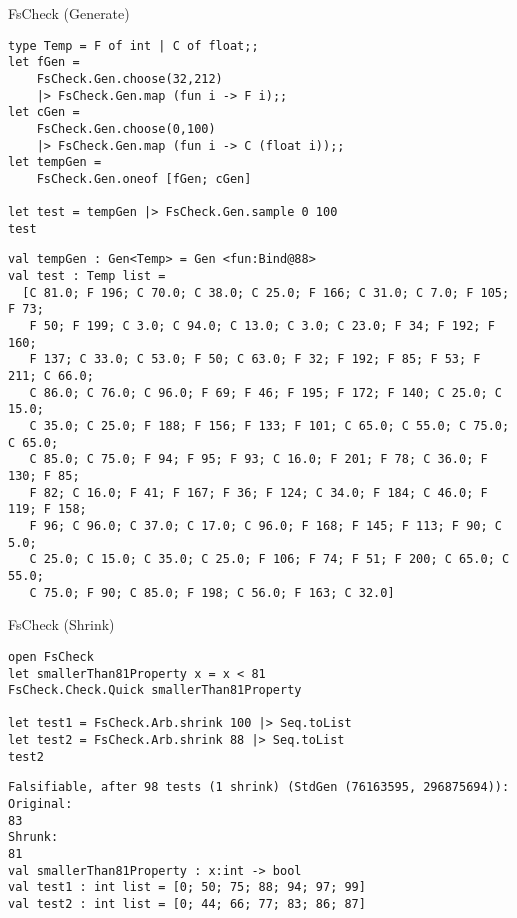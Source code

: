 \documentclass[t]{beamer}
\begin{document}
\begin{frame}[label={sec:org23fb002},fragile]{FsCheck (Generate)}
 \begin{verbatim}
type Temp = F of int | C of float;;
let fGen =
    FsCheck.Gen.choose(32,212)
    |> FsCheck.Gen.map (fun i -> F i);;
let cGen =
    FsCheck.Gen.choose(0,100)
    |> FsCheck.Gen.map (fun i -> C (float i));;
let tempGen =
    FsCheck.Gen.oneof [fGen; cGen]

let test = tempGen |> FsCheck.Gen.sample 0 100
test
\end{verbatim}

\begin{verbatim}
val tempGen : Gen<Temp> = Gen <fun:Bind@88>
val test : Temp list =
  [C 81.0; F 196; C 70.0; C 38.0; C 25.0; F 166; C 31.0; C 7.0; F 105; F 73;
   F 50; F 199; C 3.0; C 94.0; C 13.0; C 3.0; C 23.0; F 34; F 192; F 160;
   F 137; C 33.0; C 53.0; F 50; C 63.0; F 32; F 192; F 85; F 53; F 211; C 66.0;
   C 86.0; C 76.0; C 96.0; F 69; F 46; F 195; F 172; F 140; C 25.0; C 15.0;
   C 35.0; C 25.0; F 188; F 156; F 133; F 101; C 65.0; C 55.0; C 75.0; C 65.0;
   C 85.0; C 75.0; F 94; F 95; F 93; C 16.0; F 201; F 78; C 36.0; F 130; F 85;
   F 82; C 16.0; F 41; F 167; F 36; F 124; C 34.0; F 184; C 46.0; F 119; F 158;
   F 96; C 96.0; C 37.0; C 17.0; C 96.0; F 168; F 145; F 113; F 90; C 5.0;
   C 25.0; C 15.0; C 35.0; C 25.0; F 106; F 74; F 51; F 200; C 65.0; C 55.0;
   C 75.0; F 90; C 85.0; F 198; C 56.0; F 163; C 32.0]
\end{verbatim}
\end{frame}

\begin{frame}[label={sec:orgb649121},fragile]{FsCheck (Shrink)}
 \begin{verbatim}
open FsCheck
let smallerThan81Property x = x < 81
FsCheck.Check.Quick smallerThan81Property

let test1 = FsCheck.Arb.shrink 100 |> Seq.toList
let test2 = FsCheck.Arb.shrink 88 |> Seq.toList
test2
\end{verbatim}

\begin{verbatim}
Falsifiable, after 98 tests (1 shrink) (StdGen (76163595, 296875694)):
Original:
83
Shrunk:
81
val smallerThan81Property : x:int -> bool
val test1 : int list = [0; 50; 75; 88; 94; 97; 99]
val test2 : int list = [0; 44; 66; 77; 83; 86; 87]
\end{verbatim}
\end{frame}
\end{document}
